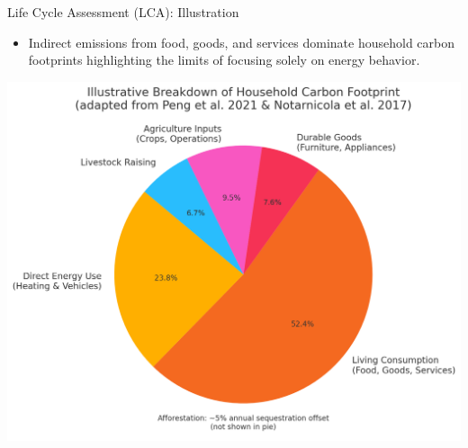 \documentclass{beamer}
\begin{document}
\begin{frame}{Life Cycle Assessment (LCA): Illustration}
\vspace{-2.5em}
\footnotesize
\begin{itemize}
  \item Indirect emissions from food, goods, and services dominate household carbon footprints highlighting the limits of focusing solely on energy behavior.
\end{itemize}
\begin{center}
\includegraphics[width=0.68\linewidth]{LCA_pie.png}
\end{center}


\end{frame}
\end{document}
